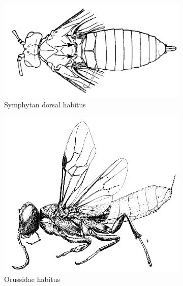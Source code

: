\documentclass[letterpaper, 11pt]{article}
\begin{document}
\begin{figure}[ht!]
    \centering
    \begin{subfigure}[ht!]{0.47\textwidth}
        \includegraphics[width=\textwidth]{SymphytaHabitus}
        \caption{Symphytan dorsal habitus \citep[][pg. 42]{goulet1993hymenoptera}}
        \label{fig:symphyt1}
    \end{subfigure}
    \hfill 
    \begin{subfigure}[ht!]{0.45\textwidth}
        \includegraphics[width=\textwidth]{OrussidHabitus}
        \caption{Orussidae habitus \citep[][Fig. 24]{goulet1993hymenoptera}}
        \label{fig:orussid1}
    \end{subfigure}
    \caption{}\label{fig:symphytans}
\end{figure}
\end{document}
